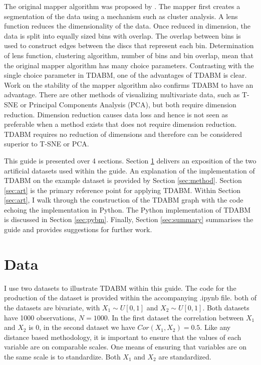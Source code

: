 \documentclass{article}
\begin{document}
The original mapper algorithm was proposed by \cite{singh2007topological}. The \cite{singh2007topological} mapper first creates a segmentation of the data using a mechanism such as cluster analysis. A lens function reduces the dimensionality of the data. Once reduced in dimension, the data is split into equally sized bins with overlap. The overlap between bins is used to construct edges between the discs that represent each bin. Determination of lens function, clustering algorithm, number of bins and bin overlap, mean that the original mapper algorithm has many choice parameters. Contrasting with the single choice parameter in TDABM, one of the advantages of TDABM is clear. Work on the stability of the mapper algorithm also confirms TDABM to have an advantage. There are other methods of visualizing multivariate data, such as T-SNE or Principal Components Analysis (PCA), but both require dimension reduction. Dimension reduction causes data loss and hence is not seen as preferable when a method exists that does not require dimension reduction. TDABM requires no reduction of dimensions and therefore can be considered superior to T-SNE or PCA.

This guide is presented over 4 sections. Section \ref{sec:data} delivers an exposition of the two artificial datasets used within the guide. An explanation of the implementation of TDABM on the example dataset is provided by Section \ref{sec:method}. Section \ref{sec:art} is the primary reference point for applying TDABM. Within Section \ref{sec:art}, I walk through the construction of the TDABM graph with the code echoing the implementation in Python. The Python implementation of TDABM is discussed in Section \ref{sec:pybm}. Finally, Section \ref{sec:summary} summarises the guide and provides suggestions for further work.


\section{Data}
\label{sec:data}

I use two datasets to illustrate TDABM within this guide. The code for the production of the dataset is provided within the accompanying .ipynb file. both of the datasets are bivariate, with $X_1 \sim U[0,1]$ and $X_2 \sim U[0,1]$. Both datasets have 1000 observations, $N=1000$. In the first dataset the correlation between $X_1$ and $X_2$ is 0, in the second dataset we have $Cor(X_1,X_2) = 0.5$. Like any distance based methodology, it is important to ensure that the values of each variable are on comparable scales. One means of ensuring that variables are on the same scale is to standardize. Both $X_1$ and $X_2$ are standardized.  
\end{document}
